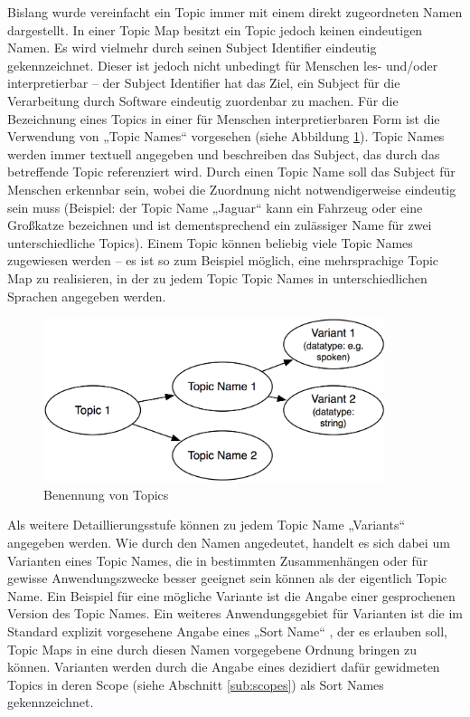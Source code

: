 Bislang wurde vereinfacht ein Topic immer mit einem direkt zugeordneten Namen dargestellt. In einer Topic Map besitzt ein Topic jedoch keinen eindeutigen Namen. Es wird vielmehr durch seinen Subject Identifier eindeutig gekennzeichnet. Dieser ist jedoch nicht unbedingt für Menschen les- und/oder interpretierbar -- der Subject Identifier hat das Ziel, ein Subject für die Verarbeitung durch Software eindeutig zuordenbar zu machen. Für die Bezeichnung eines Topics in einer für Menschen interpretierbaren Form ist die Verwendung von „Topic Names“ vorgesehen (siehe Abbildung \ref{fig:img_Persistenz_TopicNaming}). Topic Names werden immer textuell angegeben und beschreiben das Subject, das durch das betreffende Topic referenziert wird. Durch einen Topic Name soll das Subject für Menschen erkennbar sein, wobei die Zuordnung nicht notwendigerweise eindeutig sein muss (Beispiel: der Topic Name „Jaguar“ kann ein Fahrzeug oder eine Großkatze bezeichnen und ist dementsprechend ein zulässiger Name für zwei unterschiedliche Topics). Einem Topic können beliebig viele Topic Names zugewiesen werden -- es ist so zum Beispiel möglich, eine mehrsprachige Topic Map zu realisieren, in der zu jedem Topic Topic Names in unterschiedlichen Sprachen angegeben werden. 

\begin{figure}[htbp]
	\centering
		\includegraphics[width=10cm]{img/Persistenz/TopicNaming.png}
	\caption{Benennung von Topics}
	\label{fig:img_Persistenz_TopicNaming}
\end{figure}

Als weitere Detaillierungsstufe können zu jedem Topic Name „Variants“ angegeben werden. Wie durch den Namen angedeutet, handelt es sich dabei um Varianten eines Topic Names, die in bestimmten Zusammenhängen oder für gewisse Anwendungszwecke besser geeignet sein können als der eigentlich Topic Name. Ein Beispiel für eine mögliche Variante ist die Angabe einer gesprochenen Version des Topic Names. Ein weiteres Anwendungsgebiet für Varianten ist die im Standard explizit vorgesehene Angabe eines „Sort Name“ \citep[][S. 18]{TMDM08}, der es erlauben soll, Topic Maps in eine durch diesen Namen vorgegebene Ordnung bringen zu können. Varianten werden durch die Angabe eines dezidiert dafür gewidmeten Topics in deren Scope (siehe Abschnitt \ref{sub:scopes}) als Sort Names gekennzeichnet.


